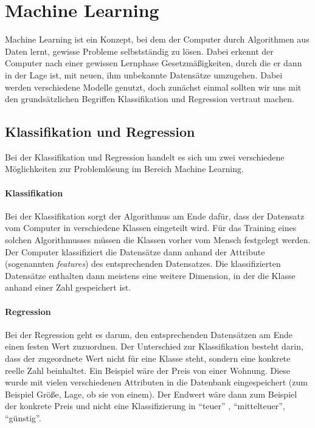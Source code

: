 \section{Machine Learning}
Machine Learning ist ein Konzept, bei dem der Computer durch Algorithmen aus Daten lernt, gewisse Probleme selbstständig zu lösen. Dabei erkennt der Computer nach einer gewissen Lernphase Gesetzmä\ss igkeiten, durch die er dann in der Lage ist, mit neuen, ihm unbekannte Datensätze umzugehen. Dabei werden verschiedene Modelle genutzt, doch zunächst einmal sollten wir uns mit den grundsätzlichen Begriffen Klassifikation und Regression vertraut machen.

\subsection{Klassifikation und Regression}
Bei der Klassifikation und Regression handelt es sich um zwei verschiedene Möglichkeiten zur Problemlösung im Bereich Machine Learning.

\paragraph{Klassifikation}
Bei der Klassifikation sorgt der Algorithmus am Ende dafür, dass der Datensatz vom Computer in verschiedene Klassen eingeteilt wird. F\"ur das Training eines solchen Algorithmusses müssen die Klassen vorher vom Mensch festgelegt werden. Der Computer klassifiziert die Datensätze dann anhand der Attribute (sogenannten \emph{features}) des entsprechenden Datensatzes. Die klassifizierten Datensätze enthalten dann meistens eine weitere Dimension, in der die Klasse anhand einer Zahl gespeichert ist.

\paragraph{Regression}
Bei der Regression geht es darum, den entsprechenden Datensätzen am Ende einen festen Wert zuzuordnen. Der Unterschied zur Klassifikation besteht darin, dass der zugeordnete Wert nicht für eine Klasse steht, sondern eine konkrete reelle Zahl beinhaltet. Ein Beispiel wäre der Preis von einer Wohnung. Diese wurde mit vielen verschiedenen Attributen in die Datenbank eingespeichert (zum Beispiel Größe, Lage, ob sie von einem). Der Endwert wäre dann zum Beispiel der konkrete Preis und nicht eine Klassifizierung in \enquote{teuer} , \enquote{mittelteuer}, \enquote{g\"unstig}. 

